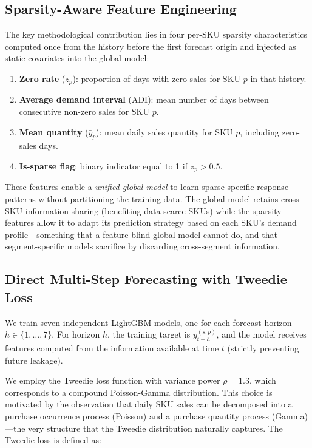 \documentclass[review,authoryear]{elsarticle}
\begin{document}
\subsection{Sparsity-Aware Feature Engineering}

The key methodological contribution lies in four per-SKU sparsity characteristics computed once from the history before the first forecast origin and injected as static covariates into the global model:

\begin{enumerate}
    \item \textbf{Zero rate} ($z_p$): proportion of days with zero sales for SKU $p$ in that history.
    \item \textbf{Average demand interval} (ADI): mean number of days between consecutive non-zero sales for SKU $p$.
    \item \textbf{Mean quantity} ($\bar{y}_p$): mean daily sales quantity for SKU $p$, including zero-sales days.
    \item \textbf{Is-sparse flag}: binary indicator equal to 1 if $z_p > 0.5$.
\end{enumerate}

These features enable a \emph{unified global model} to learn sparse-specific response patterns without partitioning the training data. The global model retains cross-SKU information sharing (benefiting data-scarce SKUs) while the sparsity features allow it to adapt its prediction strategy based on each SKU's demand profile---something that a feature-blind global model cannot do, and that segment-specific models sacrifice by discarding cross-segment information.

\subsection{Direct Multi-Step Forecasting with Tweedie Loss}

We train seven independent LightGBM models, one for each forecast horizon $h \in \{1, \ldots, 7\}$. For horizon $h$, the training target is $y_{t+h}^{(s,p)}$, and the model receives features computed from the information available at time $t$ (strictly preventing future leakage).

We employ the Tweedie loss function with variance power $\rho = 1.3$, which corresponds to a compound Poisson-Gamma distribution. This choice is motivated by the observation that daily SKU sales can be decomposed into a purchase occurrence process (Poisson) and a purchase quantity process (Gamma)---the very structure that the Tweedie distribution naturally captures. The Tweedie loss is defined as:
\end{document}
